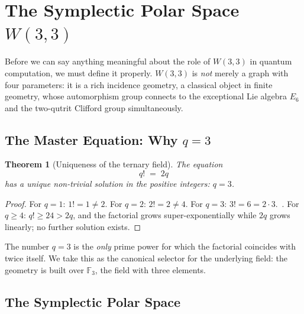 ﻿\documentclass[12pt]{article}
\newtheorem{theorem}{Theorem}[section]
\newcommand{\GF}[1]{\mathbb{F}_{#1}}
\begin{document}
\section{The Symplectic Polar Space \texorpdfstring{$W(3,3)$}{W(3,3)}}
\label{sec:w33}

Before we can say anything meaningful about the role of $W(3,3)$ in quantum
computation, we must define it properly.  $W(3,3)$ is \emph{not} merely a graph with
four parameters: it is a rich incidence geometry, a classical object in finite
geometry, whose automorphism group connects to the exceptional Lie algebra $E_6$ and
the two-qutrit Clifford group simultaneously.

\subsection{The Master Equation: Why \texorpdfstring{$q=3$}{q=3}}

\begin{theorem}[Uniqueness of the ternary field]\label{thm:dioph}
The equation
\begin{equation}
  q! \;=\; 2q
  \label{eq:dioph}
\end{equation}
has a unique non-trivial solution in the positive integers: $q = 3$.
\end{theorem}

\begin{proof}
For $q=1$: $1!=1 \neq 2$.  For $q=2$: $2!=2 \neq 4$.  For $q=3$:
$3!=6=2\cdot 3$.\ \checkmark.  For $q\ge 4$: $q! \ge 24 > 2q$, and the factorial
grows super-exponentially while $2q$ grows linearly; no further solution exists.
\end{proof}

The number $q=3$ is the \emph{only} prime power for which the factorial coincides
with twice itself.  We take this as the canonical selector for the underlying field:
the geometry is built over $\GF{3}$, the field with three elements.

\subsection{The Symplectic Polar Space}
\end{document}
